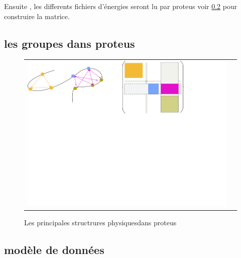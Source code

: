 Ensuite , les differents fichiers d'énergies seront lu par proteus voir \ref{} pour construire la matrice.

\subsection{les groupes dans proteus}
   \begin{figure}[t]
     \centering
     \begin{tabular}{cc}
       \includegraphics[width=12cm]{graphe/proteus/grp_matrix.png} &
     \end{tabular}
     
     \caption{Les principales structrures \og physiques\fg dans proteus}
\label{graph:struct_Phy}
   \end{figure}
   

   

\subsection{modèle de données} 


